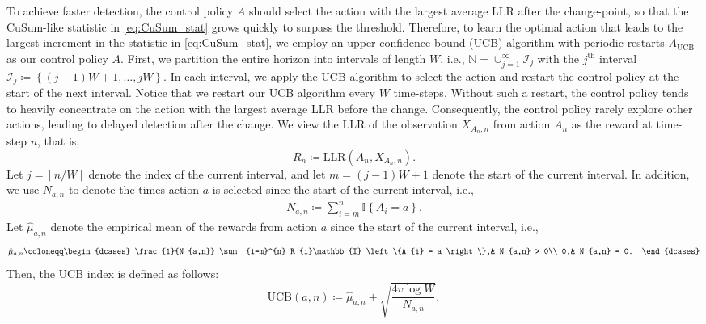 \documentclass[letterpaper, 10 pt, conference]{ieeeconf}  %
\newcommand{\lp}{\left(}
\newcommand{\rp}{\right)}
\newcommand{\lbp}{\left\{}
\newcommand{\rbp}{\right\}}
\newcommand{\mcal}{\mathcal}
\newcommand{\mrm}{\mathrm}
\newcommand{\mbb}{\mathbb}
\newcommand{\lce}{\left\lceil}
\newcommand{\rce}{\right\rceil}
\begin{document}
To achieve faster detection, the control policy $A$ should select the action with the largest average LLR after the change-point, so that the CuSum-like statistic in \eqref{eq:CuSum_stat} grows quickly to surpass the threshold. Therefore, to learn the optimal action that leads to the largest increment in the statistic in \eqref{eq:CuSum_stat}, we employ an upper confidence bound (UCB) algorithm \cite{auer2002finite} with periodic restarts $A_{\mrm{UCB}}$ as our control policy $A$. First, we partition the entire horizon into intervals of length $W$, i.e., $\mbb{N} = \cup_{j=1}^{\infty} \mcal{I}_{j}$ with the $j^{\mrm{th}}$ interval $\mcal{I}_{j} \coloneqq \lbp \lp j-1 \rp W + 1, \dots, jW \rbp$. In each interval, we apply the UCB algorithm to select the action and restart the control policy at the start of the next interval. 
Notice that we restart our UCB algorithm every $W$ time-steps. Without such a restart, the control policy tends to heavily concentrate on the action with the largest average LLR before the change. Consequently, the control policy rarely explore other actions, leading to delayed detection after the change.
We view the LLR of the observation  $X_{A_{n}, n}$ from action $A_{n}$ as the reward at time-step $n$, that is,
%
\begin{equation}\label{eq:reward}
    R_{n} \coloneqq \mrm{LLR} \lp A_{n}, X_{A_{n}, n} \rp.
\end{equation}
%
Let $j = \lce n / W \rce$ denote the index of the current interval, and let $m = \lp j - 1 \rp W + 1$ denote the start of the current interval. In addition, we use $N_{a, n}$ to denote the times action $a$ is selected since the start of the current interval, i.e.,
%
\begin{align}\label{eq:N_an}
    N_{a, n} \coloneqq \sum_{i=m}^{n} \mbb{I} \lbp A_{i} = a \rbp.
\end{align}
%
Let $\hat{\mu}_{a, n}$ denote the empirical mean of the rewards from action $a$ since the start of the current interval, i.e.,
%
\begin{align}\label{eq:mu_hat}
    \hat{\mu}_{a, n} \coloneqq \begin{dcases}
        \frac{1}{N_{a,n}} \sum_{i=m}^{n} R_{i}\mbb{I} \lbp A_{i} = a \rbp,& N_{a,n} > 0\\
        0,& N_{a,n} = 0.
    \end{dcases}
\end{align}
%
Then, the UCB index is defined as follows:
%
\begin{equation}\label{eq:UCB_index}
    \mrm{UCB} \lp a, n \rp \coloneqq \hat{\mu}_{a, n} + \sqrt{\frac{4v\log W}{N_{a,n}}},
\end{equation}
\end{document}
